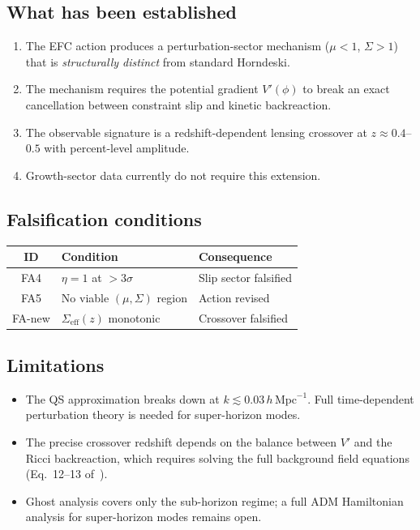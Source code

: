 \documentclass[11pt,a4paper]{article}
\begin{document}
\subsection{What has been established}

\begin{enumerate}
\item The EFC action produces a perturbation-sector mechanism
  ($\mu < 1$, $\Sigma > 1$) that is \emph{structurally distinct}
  from standard Horndeski.
\item The mechanism requires the potential gradient $V'(\phi)$ to
  break an exact cancellation between constraint slip and kinetic
  backreaction.
\item The observable signature is a redshift-dependent lensing
  crossover at $z \approx 0.4$--$0.5$ with percent-level amplitude.
\item Growth-sector data currently do not require this extension.
\end{enumerate}

\subsection{Falsification conditions}

\begin{center}
\begin{tabular}{@{}clp{6cm}@{}}
\toprule
ID & Condition & Consequence \\
\midrule
FA4 & $\eta = 1$ at ${>}3\sigma$ & Slip sector falsified \\
FA5 & No viable $(\mu,\Sigma)$ region & Action revised \\
FA-new & $\Sigma_{\mathrm{eff}}(z)$ monotonic & Crossover falsified \\
\bottomrule
\end{tabular}
\end{center}

\subsection{Limitations}

\begin{itemize}
\item The QS approximation breaks down at $k \lesssim 0.03\,h\,\mathrm{Mpc}^{-1}$.
  Full time-dependent perturbation theory is needed for super-horizon modes.
\item The precise crossover redshift depends on the balance between
  $V'$ and the Ricci backreaction, which requires solving the full
  background field equations (Eq.~12--13 of~\cite{magnusson2026action}).
\item Ghost analysis covers only the sub-horizon regime; a full ADM
  Hamiltonian analysis for super-horizon modes remains open.
\end{itemize}
\end{document}
